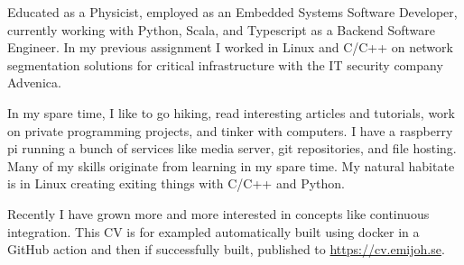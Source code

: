 

Educated as a Physicist, employed as an Embedded Systems Software Developer,
currently working with Python, Scala, and Typescript as a Backend Software
Engineer. In my previous assignment I worked in Linux and C/C++ on network
segmentation solutions for critical infrastructure with the IT security
company Advenica.

In my spare time, I like to go hiking, read interesting articles and
tutorials, work on private programming projects, and tinker with computers. I
have a raspberry pi running a bunch of services like media server, git
repositories, and file hosting. Many of my skills originate from learning in
my spare time. My natural habitate is in Linux creating exiting things with
C/C++ and Python.

Recently I have grown more and more interested in concepts like continuous
integration. This CV is for exampled automatically built using docker in a
GitHub action and then if successfully built, published
to \url{https://cv.emijoh.se}.

